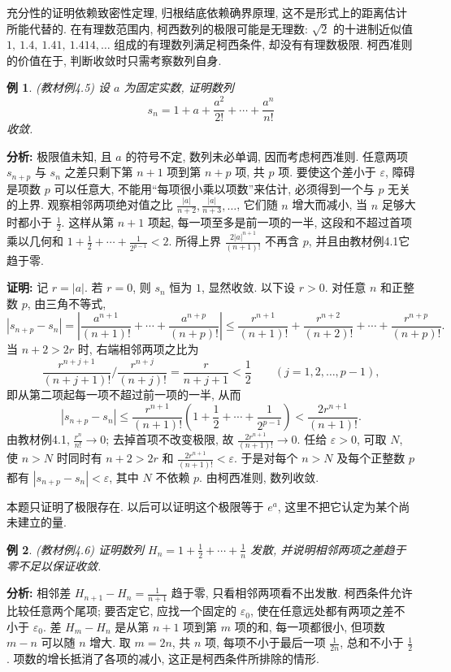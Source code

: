 \documentclass[UTF8,openany]{ctexbook}
\theoremstyle{chinesetextbook}
\newtheorem{example}{例}[section]
\newenvironment{cnproof}{\par\indent\textbf{证明:} \ignorespaces}{\par}
\begin{document}
充分性的证明依赖致密性定理, 归根结底依赖确界原理, 这不是形式上的距离估计所能代替的. 在有理数范围内, 柯西数列的极限可能是无理数: $\sqrt2$ 的十进制近似值 $1,\ 1.4,\ 1.41,\ 1.414,\ldots$ 组成的有理数列满足柯西条件, 却没有有理数极限. 柯西准则的价值在于, 判断收敛时只需考察数列自身.
\begin{example}
\textnormal{(教材例4.5)} 设 $a$ 为固定实数, 证明数列
\[
s_n=1+a+\frac{a^2}{2!}+\cdots+\frac{a^n}{n!}
\]
收敛.
\end{example}
\par\indent\textbf{分析:} 极限值未知, 且 $a$ 的符号不定, 数列未必单调, 因而考虑柯西准则. 任意两项 $s_{n+p}$ 与 $s_n$ 之差只剩下第 $n+1$ 项到第 $n+p$ 项, 共 $p$ 项. 要使这个差小于 $\varepsilon$, 障碍是项数 $p$ 可以任意大, 不能用“每项很小乘以项数”来估计, 必须得到一个与 $p$ 无关的上界. 观察相邻两项绝对值之比 $\displaystyle\frac{|a|}{n+2},\frac{|a|}{n+3},\ldots$, 它们随 $n$ 增大而减小, 当 $n$ 足够大时都小于 $\displaystyle\frac12$. 这样从第 $n+1$ 项起, 每一项至多是前一项的一半, 这段和不超过首项乘以几何和 $\displaystyle1+\frac12+\cdots+\frac1{2^{p-1}}<2$. 所得上界 $\displaystyle\frac{2|a|^{n+1}}{(n+1)!}$ 不再含 $p$, 并且由教材例4.1它趋于零.
\begin{cnproof}
记 $r=|a|$. 若 $r=0$, 则 $s_n$ 恒为 $1$, 显然收敛. 以下设 $r>0$. 对任意 $n$ 和正整数 $p$, 由三角不等式,
\[
|s_{n+p}-s_n|
=\left|\frac{a^{n+1}}{(n+1)!}+\cdots+\frac{a^{n+p}}{(n+p)!}\right|
\le\frac{r^{n+1}}{(n+1)!}+\frac{r^{n+2}}{(n+2)!}+\cdots+\frac{r^{n+p}}{(n+p)!}.
\]
当 $n+2>2r$ 时, 右端相邻两项之比为
\[
\frac{r^{n+j+1}}{(n+j+1)!}\Big/\frac{r^{n+j}}{(n+j)!}=\frac r{n+j+1}<\frac12
\qquad(j=1,2,\ldots,p-1),
\]
即从第二项起每一项不超过前一项的一半, 从而
\[
|s_{n+p}-s_n|
\le\frac{r^{n+1}}{(n+1)!}\left(1+\frac12+\cdots+\frac1{2^{p-1}}\right)
<\frac{2r^{n+1}}{(n+1)!}.
\]
由教材例4.1, $\displaystyle\frac{r^n}{n!}\to0$; 去掉首项不改变极限, 故 $\displaystyle\frac{2r^{n+1}}{(n+1)!}\to0$. 任给 $\varepsilon>0$, 可取 $N$, 使 $n>N$ 时同时有 $n+2>2r$ 和 $\displaystyle\frac{2r^{n+1}}{(n+1)!}<\varepsilon$. 于是对每个 $n>N$ 及每个正整数 $p$ 都有 $|s_{n+p}-s_n|<\varepsilon$, 其中 $N$ 不依赖 $p$. 由柯西准则, 数列收敛.
\end{cnproof}
本题只证明了极限存在. 以后可以证明这个极限等于 $e^a$, 这里不把它认定为某个尚未建立的量.
\begin{example}
\textnormal{(教材例4.6)} 证明数列 $\displaystyle H_n=1+\frac12+\cdots+\frac1n$ 发散, 并说明相邻两项之差趋于零不足以保证收敛.
\end{example}
\par\indent\textbf{分析:} 相邻差 $\displaystyle H_{n+1}-H_n=\frac1{n+1}$ 趋于零, 只看相邻两项看不出发散. 柯西条件允许比较任意两个尾项; 要否定它, 应找一个固定的 $\varepsilon_0$, 使在任意远处都有两项之差不小于 $\varepsilon_0$. 差 $H_m-H_n$ 是从第 $n+1$ 项到第 $m$ 项的和, 每一项都很小, 但项数 $m-n$ 可以随 $n$ 增大. 取 $m=2n$, 共 $n$ 项, 每项不小于最后一项 $\displaystyle\frac1{2n}$, 总和不小于 $\displaystyle\frac12$. 项数的增长抵消了各项的减小, 这正是柯西条件所排除的情形.
\end{document}
